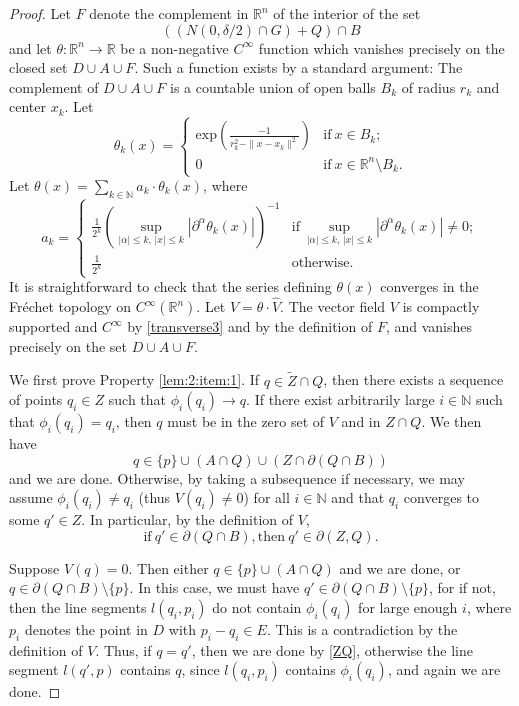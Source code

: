 \documentclass[10pt]{amsart}
\theoremstyle{definition}
\theoremstyle{definition}
\theoremstyle{definition}
\theoremstyle{definition}
\theoremstyle{definition}
\theoremstyle{definition}
\theoremstyle{definition}
\newcommand{\R}{\ensuremath{\mathbb{R}}}
\newcommand{\N}{\ensuremath{\mathbb{N}}}
\newcommand{\<}{\langle}
\renewcommand{\>}{\rangle}
\def\i{\infty}
\def\fr{\partial}
\def\a{\alpha}
\def\d{\delta}
\begin{document}
\begin{proof}
	Let \( F \) denote the complement in \( \R^n \) of the interior of the set \[ ((N(0,\d/2)\cap G)+Q)\cap B \] and let \( \theta: \R^n\to \R \) be a non-negative \( C^\i \) function which vanishes precisely on the closed set \( D\cup A \cup F \). Such a function exists by a standard argument: The complement of \( D\cup A \cup F \) is a countable union of open balls \( B_k \) of radius \( r_k \) and center \( x_k \). Let \[ \theta_k(x)=\begin{cases}
	\mathrm{exp}\left(\frac{-1}{r_k^2-\|x-x_k\|^2}\right) & \mbox{if}\ x\in B_k;\\
	0 & \mbox{if} \ x\in \R^n\setminus B_k. 
	\end{cases} \]
	Let \( \theta(x)=\sum_{k\in \N} a_k \cdot \theta_k(x) \), where 
	\[ a_k=\begin{cases}
	\frac{1}{2^k}\left(\sup_{|\a|\leq k,\,|x|\leq k}|\partial^{\a}\theta_k(x)|\right)^{-1} & \mbox{if}\ \sup_{|\a|\leq k,\, |x|\leq k}|\partial^{\a}\theta_k(x)|\neq 0;\\
	\frac{1}{2^k} & \mbox{otherwise.}
	\end{cases}
	\]
	It is straightforward to check that the series defining \( \theta(x) \) converges in the Fr\'{e}chet topology on \( C^\i(\R^n) \). Let \( V=\theta\cdot \hat{V} \). The vector field \( V \) is compactly supported and \( C^\i \) by \eqref{transverse3} and by the definition of \( F \), and vanishes precisely on the set \( D\cup A\cup F \).

	We first prove Property \ref{lem:2:item:1}. If \( q\in \tilde{Z}\cap Q \), then there exists a sequence of points \( q_i\in Z \) such that \( \phi_i(q_i)\to q \). If there exist arbitrarily large \( i\in \N \) such that \( \phi_i(q_i)= q_i \), then \( q \) must be in the zero set of \( V \) and in \( Z\cap Q \). We then have \[ q\in \{p\}\cup (A\cap Q) \cup (Z\cap \fr(Q\cap B)) \] and we are done. Otherwise, by taking a subsequence if necessary, we may assume \( \phi_i(q_i)\neq q_i \) (thus \( V(q_i)\neq 0 \)) for all \( i\in \N \) and that \( q_i \) converges to some \( q'\in Z \). In particular, by the definition of \( V \), 
	\begin{equation}
		\label{ZQ}
		\mathrm{if}\ q'\in \fr(Q\cap B)\mathrm{, then}\ q'\in \fr(Z,Q).
	\end{equation}
	
	Suppose \( V(q)=0 \). Then either \( q\in \{p\}\cup (A\cap Q) \) and we are done, or \( q\in \fr(Q\cap B)\setminus \{p\} \). In this case, we must have \( q'\in \fr(Q\cap B)\setminus \{p\} \), for if not, then the line segments \( l(q_i,p_i) \) do not contain \( \phi_i(q_i) \) for large enough \( i \), where \( p_i \) denotes the point in \( D \) with \( p_i-q_i\in E \). This is a contradiction by the definition of \( V \). Thus, if \( q=q' \), then we are done by \eqref{ZQ}, otherwise the line segment \( l(q',p) \) contains \( q \), since \( l(q_i,p_i) \) contains \( \phi_i(q_i) \), and again we are done.
	

\end{proof}
\end{document}
